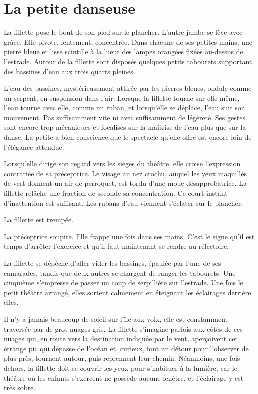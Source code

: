 \thispagestyle{empty}

\chapter{La petite danseuse}

La fillette pose le bout de son pied sur le plancher. L'autre jambe se lève avec grâce. Elle pivote, lentement, concentrée. Dans chacune de ses petites mains, une pierre bleue et lisse scintille à la lueur des lampes orangées fixées au-dessus de l'estrade. Autour de la fillette sont disposés quelques petits tabourets supportant des bassines d'eau aux trois quarts pleines.

L'eau des bassines, mystérieusement attirée par les pierres bleues, ondule comme un serpent, en suspension dans l'air. Lorsque la fillette tourne sur elle-même, l'eau tourne avec elle, comme un ruban, et lorsqu'elle se déplace, l'eau suit son mouvement. Pas suffisamment vite ni avec suffisamment de légèreté. Ses gestes sont encore trop mécaniques et focalisés sur la maîtrise de l'eau plus que sur la danse. La petite a bien conscience que le spectacle qu'elle offre est encore loin de l'élégance attendue.

Lorsqu'elle dirige son regard vers les sièges du théâtre, elle croise l'expression contrariée de sa préceptrice. Le visage au nez crochu, auquel les yeux maquillés de vert donnent un air de perroquet, est tordu d'une moue désapprobatrice. La fillette relâche une fraction de seconde sa concentration. Ce court instant d'inattention est suffisant. Les rubans d'eau viennent s'éclater sur le plancher.

La fillette est trempée.

La préceptrice soupire. Elle frappe une fois dans ses mains. C'est le signe qu'il est temps d'arrêter l'exercice et qu'il faut maintenant se rendre au réfectoire.

La fillette se dépêche d'aller vider les bassines, épaulée par l'une de ses camarades, tandis que deux autres se chargent de ranger les tabourets. Une cinquième s'empresse de passer un coup de serpillière sur l'estrade. Une fois le petit théâtre arrangé, elles sortent calmement en éteignant les éclairages derrière elles.

Il n'y a jamais beaucoup de soleil sur l'île aux voix, elle est constamment traversée par de gros nuages gris. La fillette s'imagine parfois aux côtés de ces nuages qui, en route vers la destination indiquée par le vent, aperçoivent cet étrange pic qui dépasse de l'océan et, curieux, font un détour pour l'observer de plus près, tournent autour, puis reprennent leur chemin. Néanmoins, une fois dehors, la fillette doit se couvrir les yeux pour s'habituer à la lumière, car le théâtre où les enfants s'exercent ne possède aucune fenêtre, et l'éclairage y est très sobre.

